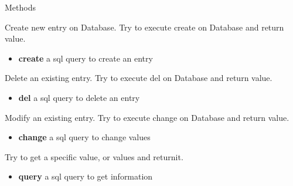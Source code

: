 \begin{methodenv}{Methods}
	
	 Create new entry on Database. Try to execute create on Database and return value.
	
	\begin{itemize}
		\item \textbf{create} 
		a sql query to create an entry
	\end{itemize}
	
	 Delete an existing entry. Try to execute del on Database and return value.
	
	\begin{itemize}
		\item \textbf{del} 
		a sql query to delete an entry
	\end{itemize}
	
	 Modify an existing entry. Try to execute change on Database and return value.
	
	\begin{itemize}
		\item \textbf{change} 
		a sql query to change values
	\end{itemize}

	 Try to get a specific value, or values and returnit.

	\begin{itemize}
		\item \textbf{query} 
		a sql query to get information
	\end{itemize}
	
\end{methodenv}

\newpage
